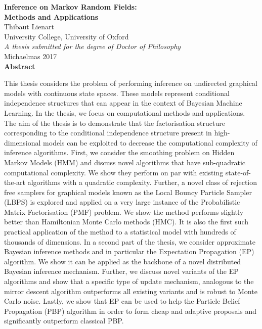 
\begin{center}
{\Large\bfseries Inference on Markov Random Fields:\\[.2cm]
Methods and Applications}\\[1cm]
{\large Thibaut Lienart}\\[.3cm]
University College, University of Oxford\\[1cm]
\emph{A thesis submitted for the degree of Doctor of Philosophy}\\[.3cm]
Michaelmas 2017\\[1.5cm]

{\large\bfseries Abstract}
\begin{flushleft}
This thesis considers the problem of performing inference on undirected graphical models with continuous state spaces. 
These models represent conditional independence structures that can appear in the context of Bayesian Machine Learning. 
In the thesis, we focus on computational methods and applications. 
The aim of the thesis is to demonstrate that the factorisation structure corresponding to the conditional independence structure present in high-dimensional models can be exploited to decrease the computational complexity of inference algorithms.
First, we consider the smoothing problem on Hidden Markov Models (HMM) and discuss novel algorithms that have sub-quadratic computational complexity. 
We show they perform on par with existing state-of-the-art algorithms with a quadratic complexity. 
Further, a novel class of rejection free samplers for graphical models known as the Local Bouncy Particle Sampler (LBPS) is explored and applied on a very large instance of the Probabilistic Matrix Factorisation (PMF) problem. 
We show the method performs slightly better than Hamiltonian Monte Carlo methods (HMC). 
It is also the first such practical application of the method to a statistical model with hundreds of thousands of dimensions. 
In a second part of the thesis, we consider approximate Bayesian inference methods and in particular the Expectation Propagation (EP) algorithm. 
We show it can be applied as the backbone of a novel distributed Bayesian inference mechanism. 
Further, we discuss novel variants of the EP algorithms and show that a specific type of update mechanism, analogous to the mirror descent algorithm outperforms all existing variants and is robust to Monte Carlo noise. 
Lastly, we show that EP can be used to help the Particle Belief Propagation (PBP) algorithm in order to form cheap and adaptive proposals and significantly outperform classical PBP. 
\end{flushleft}
\end{center}
